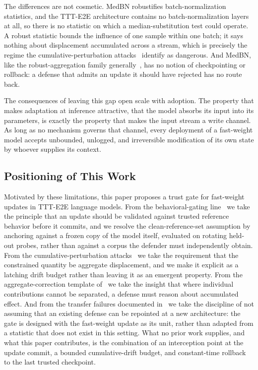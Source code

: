 \documentclass[journal]{IEEEtran}
\begin{document}
The differences are not cosmetic. MedBN robustifies batch-normalization statistics,
and the TTT-E2E architecture contains no batch-normalization layers at all, so there
is no statistic on which a median-substitution test could operate. A robust statistic
bounds the influence of one sample within one batch; it says nothing about
displacement accumulated across a stream, which is precisely the regime the
cumulative-perturbation attacks~\cite{shi2025h3ni,chen2025mghga} identify as
dangerous. And MedBN, like the robust-aggregation family
generally~\cite{blanchard2017krum,yin2018trimmed}, has no notion of checkpointing or
rollback: a defense that admits an update it should have rejected has no route back.

The consequences of leaving this gap open scale with adoption. The property that
makes adaptation at inference attractive, that the model absorbs its input into
its parameters, is exactly the property that makes the input stream a write
channel. As long as no mechanism governs that channel, every deployment of a
fast-weight model accepts unbounded, unlogged, and irreversible modification of its
own state by whoever supplies its context.

\subsection{Positioning of This Work}

Motivated by these limitations, this paper proposes a trust gate for fast-weight
updates in TTT-E2E language models. From the behavioral-gating
line~\cite{basak2025dpad,nawshin2026concurrent} we take the principle that an update
should be validated against trusted reference behavior before it commits, and we
resolve the clean-reference-set assumption by anchoring against a frozen copy of the
model itself, evaluated on rotating held-out probes, rather than against a corpus the
defender must independently obtain. From the cumulative-perturbation
attacks~\cite{shi2025h3ni,chen2025mghga,wang2026insulator} we take the requirement
that the constrained quantity be aggregate displacement, and we make it explicit as a
latching drift budget rather than leaving it as an emergent property. From the
aggregate-correction template of~\cite{huang2024ldpguard} we take the insight that
where individual contributions cannot be separated, a defense must reason about
accumulated effect. And from the transfer failures documented
in~\cite{han2025mimic} we take the discipline of not assuming that an existing
defense can be repointed at a new architecture: the gate is designed with the
fast-weight update as its unit, rather than adapted from a statistic that does not
exist in this setting. What no prior work supplies, and what this paper contributes,
is the combination of an interception point at the update commit, a bounded
cumulative-drift budget, and constant-time rollback to the last trusted checkpoint.
\end{document}

